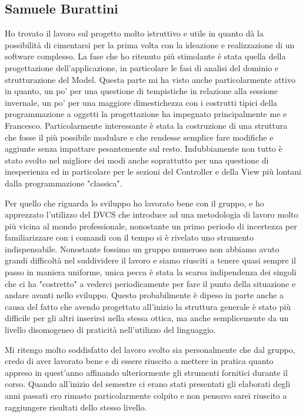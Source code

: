 \documentclass[a4paper,12pt]{report}
\begin{document}
\subsection*{Samuele Burattini}
Ho trovato il lavoro sul progetto molto istruttivo e utile in quanto dà la possibilità di cimentarsi per la prima volta con la ideazione e realizzazione di un software complesso. La fase che ho ritenuto più stimolante è stata quella della progettazione dell'applicazione, in particolare le fasi di analisi del dominio e strutturazione del Model. Questa parte mi ha visto anche particolarmente attivo in quanto, un po' per una questione di tempistiche in relazione alla sessione invernale, un po' per una maggiore dimestichezza con i costrutti tipici della programmazione a oggetti la progettazione ha impegnato principalmente me e Francesco.
Particolarmente interessante è stata la costruzione di una struttura che fosse il più possibile modulare e che rendesse semplice fare modifiche e aggiunte senza impattare pesantemente sul resto. Indubbiamente non tutto è stato svolto nel migliore dei modi anche soprattutto per una questione di inesperienza ed in particolare per le sezioni del Controller e della View più lontani dalla programmazione "classica".

Per quello che riguarda lo sviluppo ho lavorato bene con il gruppo, e ho apprezzato l'utilizzo del DVCS che introduce ad una metodologia di lavoro molto più vicina al mondo professionale, nonostante un primo periodo di incertezza per familiarizzare con i comandi con il tempo si è rivelato uno strumento indispensabile.
Nonostante fossimo un gruppo numeroso non abbiamo avuto grandi difficoltà nel suddividere il lavoro e siamo riusciti a tenere quasi sempre il passo in maniera uniforme, unica pecca è stata la scarsa indipendenza dei singoli che ci ha "costretto" a vederci periodicamente per fare il punto della situazione e andare avanti nello sviluppo. Questo probabilmente è dipeso in parte anche a causa del fatto che avendo progettato all'inizio la struttura generale è stato più difficile per gli altri inserirsi nella stessa ottica, ma anche semplicemente da un livello disomogeneo di praticità nell'utilizzo del linguaggio.

Mi ritengo molto soddisfatto del lavoro svolto sia personalmente che dal gruppo, credo di aver lavorato bene e di essere riuscito a mettere in pratica quanto appreso in quest'anno affinando ulteriormente gli strumenti fornitici durante il corso. Quando all'inizio del semestre ci erano stati presentati gli elaborati degli anni passati ero rimasto particolarmente colpito e non pensavo sarei riuscito a raggiungere risultati dello stesso livello.
\end{document}
